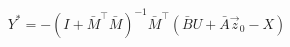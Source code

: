 \documentclass{article}
\begin{document}
\thispagestyle{empty}

$$
Y^* = -(I + \bar{M}^\top\bar{M})^{-1}\bar{M}^\top(\bar{B} U + \bar{A}\vec{z}_0 - X)
$$
\end{document}
